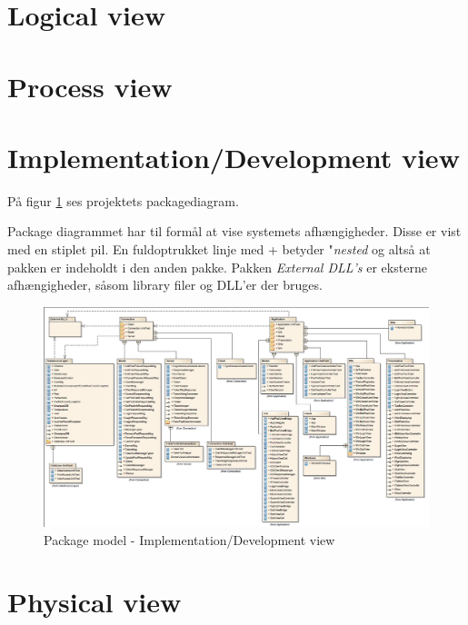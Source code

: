 \section{Logical view}

\section{Process view}

\section{Implementation/Development view}

På figur \ref{fig:packageDiagram} ses projektets packagediagram.

Package diagrammet har til formål at vise systemets afhængigheder. Disse er vist med en stiplet pil. En fuldoptrukket linje med + betyder "\textit{nested} og altså at pakken er indeholdt i den anden pakke. Pakken \textit{External DLL's} er eksterne afhængigheder, såsom library filer og DLL'er der bruges.

\begin{landscape}
	\begin{figure}[H]
		\centering
		\includegraphics[width=\linewidth]{figs/arkitektur/packageDiagram.PNG}
		\caption{Package model - Implementation/Development view}
		\label{fig:packageDiagram}
	\end{figure}
\end{landscape}

\section{Physical view}
 
